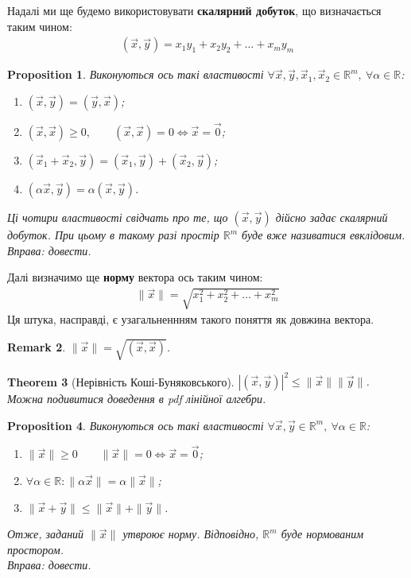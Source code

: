 \documentclass[a4paper, 10pt]{article}
\theoremstyle{theoremdd}
\newtheorem{theorem}{Theorem}[subsection]
\theoremstyle{theoremdd}
\theoremstyle{theoremdd}
\theoremstyle{theoremdd}
\theoremstyle{theoremdd}
\theoremstyle{theoremdd}
\newtheorem{proposition}[theorem]{Proposition}
\theoremstyle{theoremdd}
\newtheorem{remark}[theorem]{Remark}
\theoremstyle{theoremdd}
\theoremstyle{theoremdd}
\begin{document}
Надалі ми ще будемо використовувати \textbf{скалярний добуток}, що визначається таким чином:
\begin{align*}
(\vec{x}, \vec{y}) = x_1 y_1 + x_2 y_2 + \dots + x_m y_m
\end{align*}

\begin{proposition}
Виконуються ось такі властивості $\forall \vec{x},\vec{y},\vec{x}_1,\vec{x}_2 \in \mathbb{R}^m,\ \forall \alpha \in \mathbb{R}$:
\begin{enumerate}[nosep,wide=0pt,label={\arabic*)}]
\item $(\vec{x},\vec{y}) = (\vec{y},\vec{x})$;
\item $(\vec{x},\vec{x}) \geq 0, \qquad (\vec{x},\vec{x}) = 0 \iff \vec{x} = \vec{0}$;
\item $(\vec{x}_1 + \vec{x}_2,\vec{y}) = (\vec{x}_1,\vec{y}) + (\vec{x}_2,\vec{y})$;
\item $(\alpha \vec{x}, \vec{y}) = \alpha (\vec{x}, \vec{y})$. 
\end{enumerate}
Ці чотири властивості свідчать про те, що $(\vec{x},\vec{y})$ дійсно задає скалярний добуток. При цьому в такому разі простір $\mathbb{R}^m$ буде вже називатися евклідовим.\\
\textit{Вправа: довести.}
\end{proposition}

Далі визначимо ще \textbf{норму} вектора ось таким чином:
\begin{align*}
\|\vec{x}\| = \sqrt{x_1^2 + x_2^2 + \dots + x_m^2}
\end{align*}
Ця штука, насправді, є узагальненнням такого поняття як довжина вектора.

\begin{remark}
$\| \vec{x} \| = \sqrt{(\vec{x},\vec{x})}$.
\end{remark}

\begin{theorem}[Нерівність Коші-Буняковського]
$|(\vec{x},\vec{y})|^2 \leq \| \vec{x} \| \| \vec{y} \|$.\\
\textit{Можна подивитися доведення в pdf лінійної алгебри.}
\end{theorem}

\begin{proposition}
Виконуються ось такі властивості $\forall \vec{x},\vec{y} \in \mathbb{R}^m,\ \forall \alpha \in \mathbb{R}$:
\begin{enumerate}[nosep,wide=0pt,label={\arabic*)}]
\item $\|\vec{x}\| \geq 0 \qquad \|\vec{x}\| = 0 \iff \vec{x} = \vec{0}$;
\item $\forall \alpha \in \mathbb{R}: \| \alpha \vec{x}\| = \alpha \|\vec{x}\|$;
\item $\| \vec{x} + \vec{y} \| \leq \|\vec{x}\| + \|\vec{y}\|$.
\end{enumerate}
Отже, заданий $\|\vec{x}\|$ утвроює норму. Відповідно, $\mathbb{R}^m$ буде нормованим простором.\\
\textit{Вправа: довести.}
\end{proposition}
\end{document}
